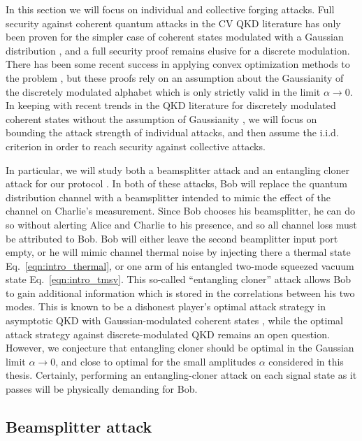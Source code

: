 In this section we will focus on individual and collective forging attacks. Full security against coherent quantum attacks in the CV QKD literature has only been proven for the simpler case of coherent states modulated with a Gaussian distribution \cite{Lodewyck2007, Leverrier2010c, Pirandola2008, Leverrier2015, Laudenbach2017, Furrer2012}, and a full security proof remains elusive for a discrete modulation. There has been some recent success in applying convex optimization methods to the problem \cite{Ghorai2019, Lin2019}, but these proofs rely on an assumption about the Gaussianity of the discretely modulated alphabet \cite{Leverrier2009} which is only strictly valid in the limit $\alpha \rightarrow 0$. In keeping with recent trends in the QKD literature for discretely modulated coherent states without the assumption of Gaussianity \cite{Papanastasiou2018},  we will focus on bounding the attack strength of individual attacks, and then assume the i.i.d. criterion \cite{Leverrier2017, Laudenbach2017} in order to reach security against collective attacks. 


In particular, we will study both a beamsplitter attack and an entangling cloner attack for our protocol \cite{Grosshans2002, Grosshans2003}. In both of these attacks, Bob will replace the quantum distribution channel with a beamsplitter intended to mimic the effect of the channel on Charlie's measurement. Since Bob chooses his beamsplitter, he can do so without alerting Alice and Charlie to his presence, and so all channel loss must be attributed to Bob. Bob will either leave the second beamplitter input port empty, or he will mimic channel thermal noise by injecting there a thermal state Eq.~\ref{eqn:intro_thermal}, or one arm of his entangled two-mode squeezed vacuum state Eq.~\ref{eqn:intro_tmsv}. This so-called ``entangling cloner'' attack allows Bob to gain additional information which is stored in the correlations between his two modes. This is known to be a dishonest player's optimal attack strategy in asymptotic QKD with Gaussian-modulated coherent states \cite{Lodewyck2007, Laudenbach2017}, while the optimal attack strategy against discrete-modulated QKD remains an open question. However, we conjecture that entangling cloner should be optimal in the Gaussian limit $\alpha \rightarrow 0$, and close to optimal for the small amplitudes $\alpha$ considered in this thesis. Certainly, performing an entangling-cloner attack on each signal state as it passes will be physically demanding for Bob.

\subsection{Beamsplitter attack}


